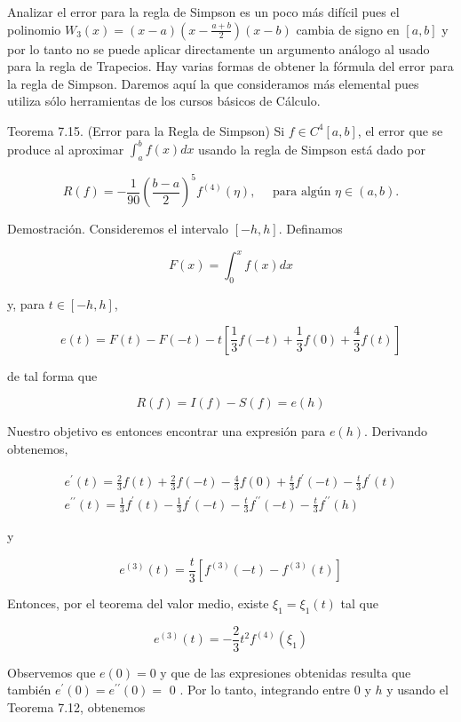 \documentclass[10pt]{book}
\begin{document}
Analizar el error para la regla de Simpson es un poco más difícil pues el polinomio $W_{3}(x)= (x-a)\left(x-\frac{a+b}{2}\right)(x-b)$ cambia de signo en $[a, b]$ y por lo tanto no se puede aplicar directamente un argumento análogo al usado para la regla de Trapecios. Hay varias formas de obtener la fórmula del error para la regla de Simpson. Daremos aquí la que consideramos más elemental pues utiliza sólo herramientas de los cursos básicos de Cálculo.

Teorema 7.15. (Error para la Regla de Simpson) Si $f \in C^{4}[a, b]$, el error que se produce al aproximar $\int_{a}^{b} f(x) d x$ usando la regla de Simpson está dado por


\begin{equation*}
R(f)=-\frac{1}{90}\left(\frac{b-a}{2}\right)^{5} f^{(4)}(\eta), \quad \text { para algún } \eta \in(a, b) . \tag{7.8}
\end{equation*}


Demostración. Consideremos el intervalo $[-h, h]$. Definamos

$$
F(x)=\int_{0}^{x} f(x) d x
$$

y, para $t \in[-h, h]$,

$$
e(t)=F(t)-F(-t)-t\left[\frac{1}{3} f(-t)+\frac{1}{3} f(0)+\frac{4}{3} f(t)\right]
$$

de tal forma que

$$
R(f)=I(f)-S(f)=e(h)
$$

Nuestro objetivo es entonces encontrar una expresión para $e(h)$. Derivando obtenemos,

$$
\begin{gathered}
e^{\prime}(t)=\frac{2}{3} f(t)+\frac{2}{3} f(-t)-\frac{4}{3} f(0)+\frac{t}{3} f^{\prime}(-t)-\frac{t}{3} f^{\prime}(t) \\
e^{\prime \prime}(t)=\frac{1}{3} f^{\prime}(t)-\frac{1}{3} f^{\prime}(-t)-\frac{t}{3} f^{\prime \prime}(-t)-\frac{t}{3} f^{\prime \prime}(h)
\end{gathered}
$$

y

$$
e^{(3)}(t)=\frac{t}{3}\left[f^{(3)}(-t)-f^{(3)}(t)\right]
$$

Entonces, por el teorema del valor medio, existe $\xi_{1}=\xi_{1}(t)$ tal que

$$
e^{(3)}(t)=-\frac{2}{3} t^{2} f^{(4)}\left(\xi_{1}\right)
$$

Observemos que $e(0)=0$ y que de las expresiones obtenidas resulta que también $e^{\prime}(0)=e^{\prime \prime}(0)=$ 0 . Por lo tanto, integrando entre 0 y $h$ y usando el Teorema 7.12, obtenemos
\end{document}

